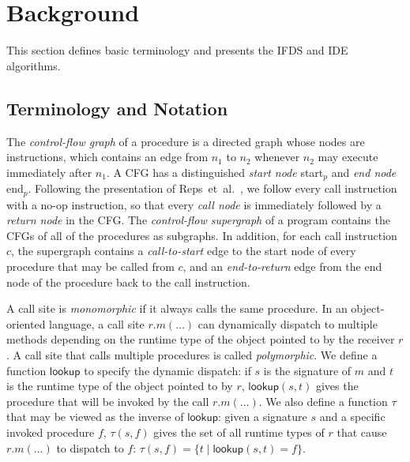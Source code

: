 \section{Background}\label{sec:bg}
This section defines basic terminology and presents the IFDS and IDE algorithms.

\subsection{Terminology and Notation}
The \textit{control-flow graph} of a procedure is a directed graph whose nodes are instructions, which contains an edge from $n_1$ to $n_2$ whenever
$n_2$ may execute immediately after $n_1$. A CFG has a distinguished \textit{start node} \textsf{start}$_p$ and \textit{end node} \textsf{end}$_p$.
Following the presentation of Reps~et~al.~\cite{reps1995precise,sagiv1996precise}, we follow every
call instruction with a no-op instruction, so that every \textit{call node} is immediately
followed by a \textit{return node} in the CFG.
The \textit{control-flow supergraph} of a program contains the CFGs of all of the procedures as
subgraphs. In addition, for each call instruction $c$, the supergraph contains a \textit{call-to-start} edge to the start node of every procedure that
may be called from $c$, and an \textit{end-to-return} edge from the end node of the procedure back to the call instruction.

A call site is \textit{monomorphic} if it always calls the same procedure. In an object-oriented language, 
a call site $r.m(\ldots)$ can dynamically dispatch to multiple methods depending on the runtime
type of the object pointed to by the receiver $r$.
A call site that calls multiple procedures is called
\textit{polymorphic}.
We define a function $\textsf{lookup}$ to specify the dynamic dispatch: 
if $s$ is the signature of $m$ and $t$ is the runtime type of the object
pointed to by $r$, $\textsf{lookup}(s,t)$ gives the procedure that will
be invoked by the call $r.m(\ldots)$. We also define a function $\tau$
that may be viewed as the inverse
of $\textsf{lookup}$: given a signature $s$ and a specific invoked procedure
$f$, $\tau(s,f)$ gives the set of all runtime types of $r$ that cause $r.m(\ldots)$
to dispatch to $f$: $\tau(s,f) = \{t\mid \textsf{lookup}(s,t)=f\}$.

